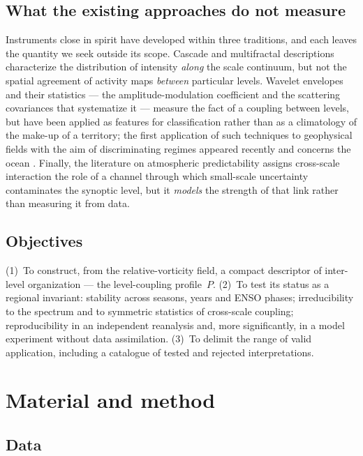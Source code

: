 \documentclass[11pt,a4paper]{article}
\begin{document}
\subsection{What the existing approaches do not measure}

Instruments close in spirit have developed within three traditions, and each leaves the quantity we seek outside its scope. Cascade and multifractal descriptions \cite{LovejoySchertzer2013,Lovejoy2011,Kouhen2024} characterize the distribution of intensity \emph{along} the scale continuum, but not the spatial agreement of activity maps \emph{between} particular levels. Wavelet envelopes and their statistics --- the amplitude-modulation coefficient \cite{Farge1992,Mathis2009} and the scattering covariances that systematize it \cite{Mallat2012,BrunaMallat2013,Cheng2024} --- measure the fact of a coupling between levels, but have been applied as features for classification rather than as a climatology of the make-up of a territory; the first application of such techniques to geophysical fields with the aim of discriminating regimes appeared recently and concerns the ocean \cite{Skinner2025}. Finally, the literature on atmospheric predictability \cite{Lorenz1969,Zhang2007,RotunnoSnyder2008,Judt2020,SelzCraig2023} assigns cross-scale interaction the role of a channel through which small-scale uncertainty contaminates the synoptic level, but it \emph{models} the strength of that link rather than measuring it from data.

\subsection{Objectives}

(1)~To construct, from the relative-vorticity field, a compact descriptor of inter-level organization --- the level-coupling profile~$P$. (2)~To test its status as a regional invariant: stability across seasons, years and ENSO phases; irreducibility to the spectrum and to symmetric statistics of cross-scale coupling; reproducibility in an independent reanalysis and, more significantly, in a model experiment without data assimilation. (3)~To delimit the range of valid application, including a catalogue of tested and rejected interpretations.

\section{Material and method}
\label{sec:data}

\subsection{Data}
\end{document}
